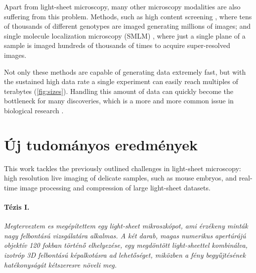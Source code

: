 \documentclass{booklet_style}
\begin{document}
Apart from light-sheet microscopy, many other microscopy modalities are also suffering from this problem. Methods, such as high content screening \cite{carpenter_systematic_2004,echeverri_high-throughput_2006,pepperkok_high-throughput_2006}, where tens of thousands of different genotypes are imaged generating millions of images; and single molecule localization microscopy (SMLM) \cite{betzig_imaging_2006,hess_ultra-high_2006,rust_sub-diffraction-limit_2006}, where just a single plane of a sample is imaged hundreds of thousands of times to acquire super-resolved images.

Not only these methods are capable of generating data extremely fast, but with the sustained high data rate a single experiment can easily reach multiples of terabytes (\autoref{fig:sizes}). Handling this amount of data can quickly become the bottleneck for many discoveries, which is a more and more common issue in biological research \cite{wollman_high_2007,reynaud_guide_2015,perkel_struggle_2016}. 








\section{Új tudományos eredmények}

This work tackles the previously outlined challenges in light-sheet microscopy: high resolution live imaging of delicate samples, such as mouse embryos, and real-time image processing and compression of large light-sheet datasets.

  \paragraph{Tézis I.}\textit{Megterveztem es megépítettem egy light-sheet mikroszkópot, ami érzékeny minták nagy felbontású vizsgálatára alkalmas. A két darab, magas numerikus apertúrájú objektív 120 fokban történő elhelyezése, egy megdöntött light-sheettel kombinálva, izotróp 3D felbontású képalkotásra ad lehetőséget, miközben a fény begyűjtésének hatékonyságát kétszeresre növeli meg.}
  
\end{document}
